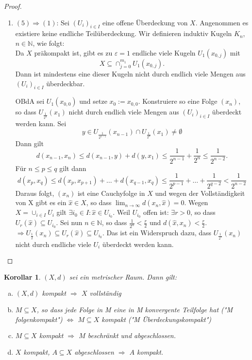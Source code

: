 \documentclass[ngerman]{report}
\theoremstyle{plain}%
\newtheorem{cor}[thm]{Korollar}
\theoremstyle{definition}%
\theoremstyle{myStyle}
\newcommand{\N}{\mathbb{N}}
\newcommand{\df}[1][]{%
	\overset{#1}{\Rightarrow}
}
\newcommand{\limes}[1][\infty]{\lim_{n \to #1}}
\newcommand{\qmarks}[1]{"#1"}
\begin{document}
\begin{proof}
\begin{enumerate}[]
		\item $(5) \df (1)$: 
			Sei $(U_i)_{i\in I}$ eine offene Überdeckung von $X$.
			Angenommen es existiere keine endliche Teilüberdeckung. Wir definieren induktiv Kugeln $K_n$, $n\in\N$, wie folgt:\\
			Da $X$ präkompakt ist, gibt es zu $\varepsilon = 1$ endliche viele Kugeln $U_1(x_{0,j})$ mit 
				$$X \subseteq \cap_{j=0}^{m_1} U_1(x_{0,j}).$$
			Dann ist mindestens eine dieser Kugeln nicht durch endlich viele Mengen aus $(U_i)_{i\in I}$ überdeckbar.\par
			OBdA sei $U_1(x_{0,0})$ und setze $x_0 := x_{0,0}$. 
			Konstruiere so eine Folge $(x_n)$, so dass $U_{\frac{1}{2^n}}(x_1)$ nicht durch endlich viele Mengen aus $(U_i)_{i\in I}$ überdeckt werden kann. 
			Sei 
				$$y \in U_{\frac{1}{2^{n-1}}}(x_{n-1}) \cap U_{\frac{1}{2^n}}(x_1) \neq \emptyset$$ 
			Dann gilt 
				$$d(x_{n-1},x_n) \leq d(x_{n-1},y) + d(y,x_1) \leq \frac{1}{2^{n-1}} + \frac{1}{2^n} \leq \frac{1}{2^{n-2}}.$$
			Für $n \leq p \leq q$ gilt dann 
				$$d(x_p,x_q) \leq d(x_p,x_{p+1}) + \dots + d(x_{q-1},x_{q})
				\leq \frac{1}{2^{p-1}} + \dots + \frac{1}{2^{q-2}} < \frac{1}{2^{n-2}}$$
			Daraus folgt, $(x_n)$ ist eine Cauchyfolge in $X$ und wegen der Vollständigkeit von X 
			gibt es ein $\hat{x} \in X$, so dass $\limes d(x_n,\hat{x}) = 0$. 
			Wegen $X = \cup_{i\in I} U_i$ gilt $\exists i_0\in I: \hat{x}\in U_{i_0}$.
			Weil $U_{i_0}$ offen ist: $\exists r>0$, so dass $U_r(\hat{x}) \subseteq U_{i_0}$.
			Sei nun $n\in \N$, so dass $\frac{1}{2^n} < \frac{r}{2}$ und $d(\hat{x}, x_n) < \frac{r}{2}$.
			$\df U_{\frac{1}{2}} (x_n) \subseteq U_r(\hat{x}) \subseteq U_{i_0}$. 
			Das ist ein Widerspruch dazu, dass $U_{\frac{1}{2^n}}(x_n)$ nicht durch endliche viele $U_i$ überdeckt werden kann.
		\end{enumerate}
	\end{proof}

	\begin{cor}
		$(X,d)$ sei ein metrischer Raum. Dann gilt:

			\begin{enumerate}[a)]
				\item $(X,d)$ kompakt $\df$ $X$ vollständig
				\item $M\subseteq X$, so dass jede Folge in M eine in M konvergente Teilfolge hat (\qmarks{M folgenkompakt})
					$\Leftrightarrow$ $M \subseteq X$ kompakt (\qmarks{M Überdeckungskompakt})

				\item $M\subseteq X$ kompakt $\df$ $M$ beschränkt und abgeschlossen.
				\item $X$ kompakt, $A \subseteq X$ abgeschlossen $\df$ $A$ kompakt.
			\end{enumerate}
	\end{cor}
\end{document}

